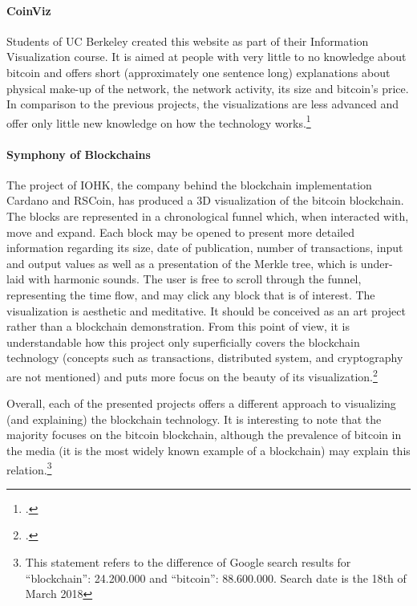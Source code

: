 \paragraph{CoinViz} Students of UC Berkeley created this website as part of their Information Visualization course. It is aimed at people with very little to no knowledge about bitcoin and offers short (approximately one sentence long) explanations about physical make-up of the network, the network activity, its size and bitcoin's price. In comparison to the previous projects, the visualizations are less advanced and offer only little new knowledge on how the technology works.\footcite[Cf.][]{GiudiciCoinViz2016}


\paragraph{Symphony of Blockchains} The project of IOHK, the company behind the blockchain implementation Cardano and RSCoin, has produced a 3D visualization of the bitcoin blockchain. The blocks are represented in a chronological funnel which, when interacted with, move and expand. Each block may be opened to present more detailed information regarding its size, date of publication, number of transactions, input and output values as well as a presentation of the Merkle tree, which is under-laid with harmonic sounds. The user is free to scroll through the funnel, representing the time flow, and may click any block that is of interest. The visualization is aesthetic and meditative. It should be conceived as an art project rather than a blockchain demonstration. From this point of view, it is understandable how this project only superficially covers the blockchain technology (concepts such as transactions, distributed system, and cryptography are not mentioned) and puts more focus on the beauty of its visualization.\footcite[Cf.][]{IOHKSymphonyBlockchains2018} 

Overall, each of the presented projects offers a different approach to visualizing (and explaining) the blockchain technology. It is interesting to note that the majority focuses on the bitcoin blockchain, although the prevalence of bitcoin in the media (it is the most widely known example of a blockchain) may explain this relation.\footnote{This statement refers to the difference of Google search results for \enquote{blockchain}: 24.200.000 and \enquote{bitcoin}: 88.600.000. Search date is the 18th of March 2018}

